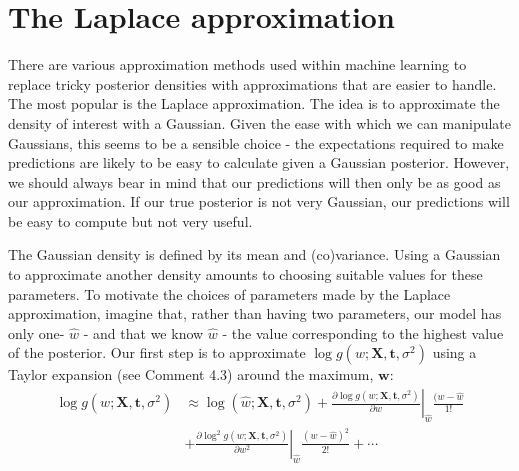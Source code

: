 \section{The Laplace approximation}

There are various approximation methods used within machine learning to replace
tricky posterior densities with approximations that are easier to handle. The most
popular is the Laplace approximation.
The idea is to approximate the density of
interest with a Gaussian. Given the ease with which we can manipulate Gaussians,
this seems to be a sensible choice - the expectations required to make predictions are
likely to be easy to calculate given a Gaussian posterior. However, we should always
bear in mind that our predictions will then only be as good as our approximation.
If our true posterior is not very Gaussian, our predictions will be easy to compute
but not very useful.

The Gaussian density is defined by its mean and (co)variance. Using a
Gaussian to approximate another density amounts to choosing suitable values for these
parameters.
To motivate the choices of parameters made by the Laplace approximation,
imagine that, rather than having two parameters, our model has only one-
$\widehat{w}$ - and that we know $\widehat{w}$ - the value corresponding
to the highest value of the
posterior. Our first step is to approximate
$\log g(w; \mathbf{X}, \mathbf{t}, \sigma^2)$ using a Taylor expansion
(see Comment 4.3) around the maximum, $\mathbf{w}$:
\begin{align*}
\log g(w; \mathbf{X}, \mathbf{t}, \sigma^2) & \approx
\log(\widehat{w}; \mathbf{X}, \mathbf{t}, \sigma^2) +
\left. \frac{\partial \log g(w; \mathbf{X}, \mathbf{t}, \sigma^2)}{\partial w} \right|_{\widehat{w}}
\frac{(w - \widehat{w}}{1!} \\
& + \left. \frac{\partial \log^2 g(w; \mathbf{X}, \mathbf{t}, \sigma^2)}{\partial w^2} \right|_{\widehat{w}}
\frac{(w - \widehat{w})^2}{2!} + \cdots
\end{align*}

